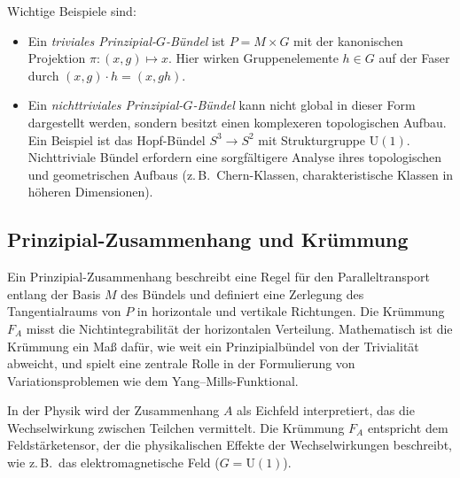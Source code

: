 \documentclass[10pt, letterpaper]{article}
\begin{document}
\begin{example} Wichtige Beispiele sind:
\begin{itemize}[leftmargin=1.2em]
  \item Ein \emph{triviales Prinzipial-\(G\)-Bündel} ist \(P = M \times G\) mit der kanonischen Projektion \(\pi: (x, g) \mapsto x\). Hier wirken Gruppenelemente \(h \in G\) auf der Faser durch \((x, g) \cdot h = (x, gh)\).
  \item Ein \emph{nichttriviales Prinzipial-\(G\)-Bündel} kann nicht global in dieser Form dargestellt werden, sondern besitzt einen komplexeren topologischen Aufbau. Ein Beispiel ist das Hopf-Bündel \(S^3 \to S^2\) mit Strukturgruppe \(\mathrm{U}(1)\). Nichttriviale Bündel erfordern eine sorgfältigere Analyse ihres topologischen und geometrischen Aufbaus (z.\,B.\ Chern-Klassen, charakteristische Klassen in höheren Dimensionen).
\end{itemize}
\end{example}

\subsection{Prinzipial-Zusammenhang und Krümmung}

Ein Prinzipial-Zusammenhang beschreibt eine Regel für den Paralleltransport entlang der Basis \(M\) des Bündels und definiert eine Zerlegung des Tangentialraums von \(P\) in horizontale und vertikale Richtungen. Die Krümmung \(F_A\) misst die Nichtintegrabilität der horizontalen Verteilung. Mathematisch ist die Krümmung ein Maß dafür, wie weit ein Prinzipialbündel von der Trivialität abweicht, und spielt eine zentrale Rolle in der Formulierung von Variationsproblemen wie dem Yang--Mills-Funktional.

In der Physik wird der Zusammenhang \(A\) als Eichfeld interpretiert, das die Wechselwirkung zwischen Teilchen vermittelt. Die Krümmung \(F_A\) entspricht dem Feldstärketensor, der die physikalischen Effekte der Wechselwirkungen beschreibt, wie z.\,B.\ das elektromagnetische Feld (\(G = \mathrm{U}(1)\)).
\end{document}
